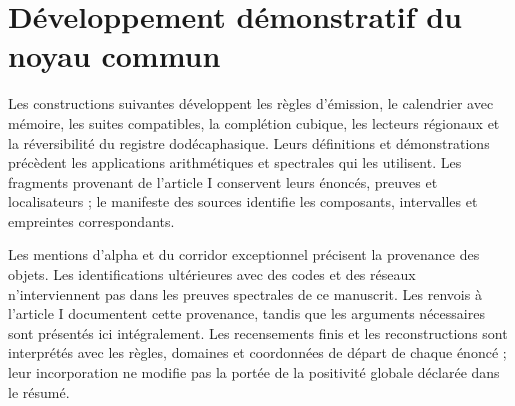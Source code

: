 \section*{Développement démonstratif du noyau commun}

Les constructions suivantes développent les règles d'émission, le calendrier avec mémoire, les suites compatibles, la complétion cubique, les lecteurs régionaux et la réversibilité du registre dodécaphasique. Leurs définitions et démonstrations précèdent les applications arithmétiques et spectrales qui les utilisent. Les fragments provenant de l'article I conservent leurs énoncés, preuves et localisateurs ; le manifeste des sources identifie les composants, intervalles et empreintes correspondants.

Les mentions d'alpha et du corridor exceptionnel précisent la provenance des objets. Les identifications ultérieures avec des codes et des réseaux n'interviennent pas dans les preuves spectrales de ce manuscrit. Les renvois à l'article I documentent cette provenance, tandis que les arguments nécessaires sont présentés ici intégralement. Les recensements finis et les reconstructions sont interprétés avec les règles, domaines et coordonnées de départ de chaque énoncé ; leur incorporation ne modifie pas la portée de la positivité globale déclarée dans le résumé.

\clearpage




\clearpage


\clearpage
\clearpage


\clearpage


\clearpage

